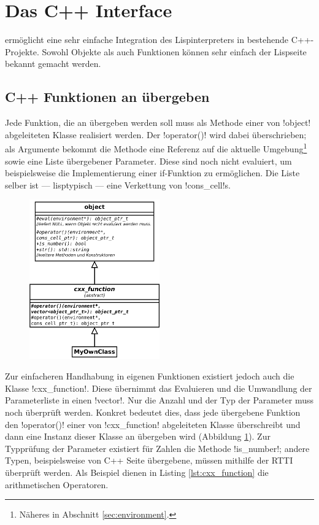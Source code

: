 \section{Das C++ Interface}
\label{sec:cxx_interface}

\projectname{} ermöglicht eine sehr einfache Integration des Lispinterpreters in bestehende C++-Projekte. Sowohl Objekte als auch Funktionen können sehr einfach der Lispseite bekannt gemacht werden.

\subsection{C++ Funktionen an \projectname{} übergeben}
\label{sec:cxx_function_interface}

Jede Funktion, die an \projectname{} übergeben werden soll muss als Methode einer von !object! abgeleiteten Klasse realisiert werden. Der !operator()! wird dabei überschrieben; als Argumente bekommt die Methode eine Referenz auf die aktuelle Umgebung\footnote{Näheres in Abschnitt \ref{sec:environment}.} sowie eine Liste übergebener Parameter. Diese sind noch nicht evaluiert, um beispielsweise die Implementierung einer if-Funktion zu ermöglichen. Die Liste selber ist --- lisptypisch ---
eine Verkettung von !cons_cell!s. 
\begin{figure}[htbp]
\centering
{}
\includegraphics[width=0.5\textwidth]{images/cxx_interface.pdf}
\label{fig:cxx_interface}
\end{figure}
Zur einfacheren Handhabung in eigenen Funktionen existiert jedoch auch die Klasse !cxx_function!. Diese übernimmt das Evaluieren und die Umwandlung der Parameterliste in einen !vector!. Nur die Anzahl und der Typ der Parameter muss noch überprüft werden. Konkret bedeutet dies, dass jede übergebene Funktion den !operator()! einer von !cxx_function! abgeleiteten Klasse überschreibt und dann eine Instanz dieser Klasse an \projectname{} übergeben wird (Abbildung \ref{fig:cxx_interface}). Zur Typprüfung der Parameter existiert für Zahlen die Methode !is_number!; andere Typen, beispielsweise von C++ Seite übergebene, müssen mithilfe der RTTI überprüft werden. Als Beispiel dienen in Listing \ref{lst:cxx_function} die arithmetischen Operatoren.
